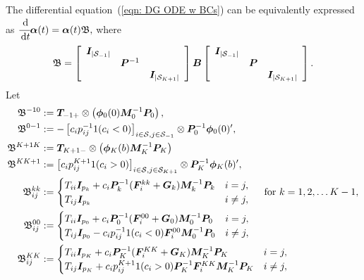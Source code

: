 The differential equation~(\ref{eqn: DG ODE w BCs}) can be equivalently expressed as 
\(\label{eqn: DG alpha ODE w BCs}
	\cfrac{\, \mathrm{d}}{\, \mathrm{d} t} \boldsymbol \alpha(t)
	= \boldsymbol \alpha(t)  { \mathfrak{\boldsymbol B}},
\)
where 
\[ {\mathfrak{\boldsymbol B}} = \left[\begin{array}{ccc}
		\boldsymbol I_{|\mathcal{S}_{-1}|} & & \\
		& \boldsymbol P^{-1} &  \\
		& & \boldsymbol I_{|\mathcal{S}_{K+1}|}
	\end{array}\right]
	\boldsymbol B
	\left[\begin{array}{ccc}
		\boldsymbol I_{|\mathcal{S}_{-1}|} & & \\
		& \boldsymbol P&  \\
		& & \boldsymbol I_{|\mathcal{S}_{K+1}|}
	\end{array}\right].\] 
Let
\begin{align*}
 {  {\mathfrak{\bs B}}}^{{-1}0} &:= \bs T_{{-1}+}\otimes\left( \boldsymbol\phi_0(0)\bs M_0^{-1}\bs P_0\right),
 \\ {  {\mathfrak{\bs B}}}^{0{-1}} &:=-\left[c_ip_{ij}^{-1} 1{(c_i<0)}\right]_{i\in\calS,j\in\calS_{{-1}}}\otimes \bs P_0^{-1}\boldsymbol \phi_0(0)\tr{},
 \\ {  {\mathfrak{\bs B}}}^{{K+1} K} &:= \bs T_{{K+1}-}\otimes \left(\boldsymbol\phi_K(b)\bs M_K^{-1}\bs P_K\right)
 \\ {  {\mathfrak{\bs B}}}^{K {K+1}} &:= \left[c_ip_{ij}^{K+1} 1{(c_i>0)}\right]_{i\in\calS,j\in\calS_{K+1}} \otimes  \bs P_K^{-1} \boldsymbol\phi_K(b)\tr{},
 \\\mathfrak{\bs B}^{kk}_{ij} &:= \begin{cases}
    	T_{ii}\bs I_{p_k} + c_i\bs P_k^{-1}(\bs F_i^{kk}+\bs G_k)\bs M_k^{-1}\bs P_k & i = j, \\
	T_{ij}\bs I_{p_k} & i \neq j,
    \end{cases}\quad \mbox{ for \(k=1,2,\dots K-1\),}
 \\\mathfrak{\bs B}^{00}_{ij} &:= \begin{cases}
	T_{ii}\bs I_{p_0} + c_i\bs P_0^{-1}(\bs F_i^{00}+\bs G_0)\bs M_0^{-1}\bs P_0 & i = j, \\
T_{ij}\bs I_{p_0} - c_ip_{ij}^{-1} 1(c_i<0)\bs F_i^{00}\bs M_0^{-1}\bs P_0 & i \neq j,
\end{cases}
%
\\\mathfrak{\bs B}^{KK}_{ij} &:= \begin{cases}
	T_{ii}\bs I_{p_K} + c_i\bs P_K^{-1}(\bs F_i^{KK}+\bs G_K)\bs M_K^{-1}\bs P_K & i = j, \\
T_{ij}\bs I_{p_K} + c_ip_{ij}^{K+1} 1(c_i>0)\bs P_K^{-1}\bs F_i^{KK}\bs M_K^{-1}\bs P_K & i \neq j,

\end{cases}
\end{align*}
